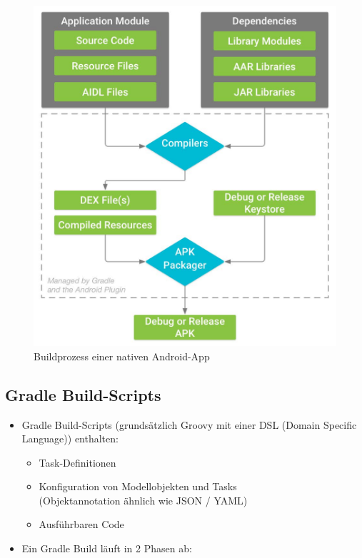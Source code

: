 \documentclass[a4paper]{article}
\begin{document}
{	\begin{figure}[!htb]
		\centering
		\includegraphics[width=.7\textwidth]{img/flashtalk1/buildprocess.jpg}
		\caption{Buildprozess einer nativen Android-App}
		\label{fig:buildprocess}
	\end{figure}

	\newpage

	\subsection{Gradle Build-Scripts}
	
	\begin{itemize}
		
		\item Gradle Build-Scripts (grundsätzlich Groovy mit einer DSL (Domain Specific Language)) enthalten:
		\begin{itemize}
			
			\item Task-Definitionen
			
			\item Konfiguration von Modellobjekten und Tasks \\
					(Objektannotation ähnlich wie JSON / YAML)
					
			\item Ausführbaren Code
		\end{itemize}
		
		\item Ein Gradle Build läuft in 2 Phasen ab:
		\begin{enumerate}
			

\end{enumerate}
\end{itemize}}
\end{document}
